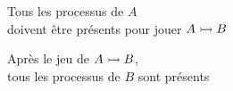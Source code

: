 \begin{frame}[c]
\begin{columns}
\begin{column}{.55\textwidth}
\begin{center}


\vspace*{.5cm}
Tous les processus de $A$\\
doivent être présents pour jouer $\mbox{$A \rightarrowtail B$}$

\medskip
Après le jeu de $\mbox{$A \rightarrowtail B$}$,\\
tous les processus de $B$ sont présents
% 
% 
% 

\end{center}
\end{column}
\end{columns}


\end{frame}
